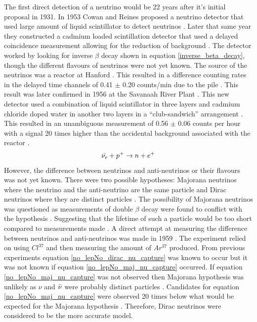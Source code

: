 The first direct detection of a neutrino would be 22 years after it's initial proposal in 1931. In 1953 Cowan and Reines proposed a neutrino detector that used large amount of liquid scintillator to detect neutrinos \cite{reines1953proposed}. Later that same year they constructed a cadmium loaded scintillation detector that used a delayed coincidence measurement allowing for the reduction of background \cite{reines1953proposed} \cite{reines1953detection}. The detector worked by looking for inverse $\beta$ decay shown in equation \ref{inverse_beta_decay}, though the different flavours of neutrinos were not yet known. The source of the neutrinos was a reactor at Hanford \cite{reines1953detection}. This resulted in a difference counting rates in the delayed time channels of 0.41 $\pm$ 0.20 counts/min due to the pile \cite{reines1953detection}. This result was later confirmed in 1956 at the Savanaah River Plant \cite{Cowan1956Confirmation}. This new detector used a combination of liquid scintillator in three layers and cadmium chloride doped water in another two layers in a ``club-sandwich'' arrangement \cite{Cowan1956Confirmation}. This resulted in an unambiguous measurement of 0.56 $\pm$ 0.06 counts per hour with a signal 20 times higher than the accidental background associated with the reactor \cite{Cowan1956Confirmation}. 
\begin{equation}
    \Bar{\nu_e} + p^+ \rightarrow n + e^+
    \label{inverse_beta_decay}
\end{equation}
However, the difference between neutrinos and anti-neutrinos or their flavours was not yet known. There were two possible hypotheses: Majorana neutrinos where the neutrino and the anti-neutrino are the same particle and Dirac neutrinos where they are distinct particles \cite{griffiths2008book} \cite{griffiths2008neutrino1.5} \cite{cowan1957test}. The possibility of Majorana neutrinos was questioned as measurements of double $\beta$ decay were found to conflict with the hypothesis \cite{cowan1957test}. Suggesting that the lifetime of such a particle would be too short compared to measurements made \cite{cowan1957test}. A direct attempt at measuring the difference between neutrinos and anti-neutrinos was made in 1959 \cite{davis1959attempt}. The experiment relied on using $Cl^{37}$ and then measuring the amount of $Ar^{37}$ produced. From previous experiments \cite{Cowan1956Confirmation} equation \ref{no_lepNo_dirac_nu_capture} was known to occur but it was not known if equation \ref{no_lepNo_maj_nu_capture} occurred. If equation \ref{no_lepNo_maj_nu_capture} was not observed then Majorana hypothesis was unlikely as $\nu$ and $\Bar{\nu}$ were probably distinct particles \cite{griffiths2008book} \cite{griffiths2008neutrino1.5} \cite{davis1959attempt}. Candidates for equation \ref{no_lepNo_maj_nu_capture} were observed 20 times below what would be expected for the Majorana hypothesis \cite{davis1959attempt}. Therefore, Dirac neutrinos were considered to be the more accurate model. 
